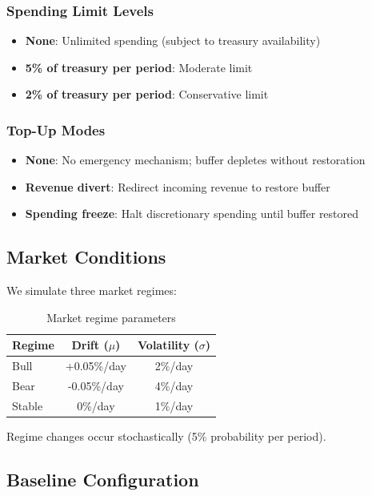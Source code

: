 \subsubsection{Spending Limit Levels}

\begin{itemize}
    \item \textbf{None}: Unlimited spending (subject to treasury availability)
    \item \textbf{5\% of treasury per period}: Moderate limit
    \item \textbf{2\% of treasury per period}: Conservative limit
\end{itemize}

\subsubsection{Top-Up Modes}

\begin{itemize}
    \item \textbf{None}: No emergency mechanism; buffer depletes without restoration
    \item \textbf{Revenue divert}: Redirect incoming revenue to restore buffer
    \item \textbf{Spending freeze}: Halt discretionary spending until buffer restored
\end{itemize}

\subsection{Market Conditions}

We simulate three market regimes:

\begin{table}[htbp]
\centering
\caption{Market regime parameters}
\label{tab:market-regimes}
\begin{tabular}{lcc}
\toprule
Regime & Drift ($\mu$) & Volatility ($\sigma$) \\
\midrule
Bull & +0.05\%/day & 2\%/day \\
Bear & -0.05\%/day & 4\%/day \\
Stable & 0\%/day & 1\%/day \\
\bottomrule
\end{tabular}
\end{table}

Regime changes occur stochastically (5\% probability per period).

\subsection{Baseline Configuration}

